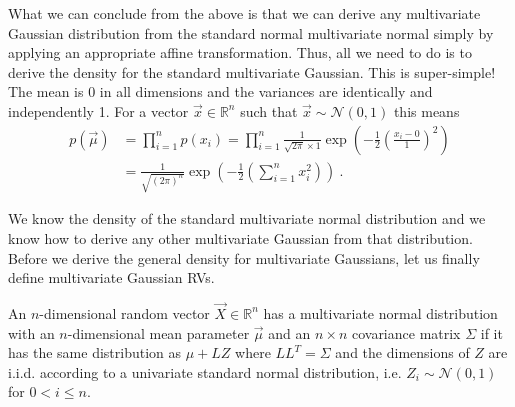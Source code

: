 \documentclass[a4paper,11pt,leqno]{report}\usepackage[]{graphicx}\usepackage[]{color}
\newcommand{\N}[2]{\mathcal{N}\left( #1, #2 \right)}
\begin{document}
What we can conclude from the above is that we can derive any multivariate Gaussian distribution from the standard normal multivariate normal simply by applying an
appropriate affine transformation. Thus, all we need to do is to derive the density for the standard multivariate Gaussian. This is super-simple! The mean is $ 0 $
in all dimensions and the variances are identically and independently 1. For a vector $ \vec{x} \in \mathbb{R}^{n} $ such that $ \vec{x} \sim \N{0}{1} $ this means
\begin{align}\label{eq:mvstandardNormal}
p(\vec{\mu}) &= \prod_{i=1}^{n} p(x_{i}) = \prod_{i=1}^{n} \frac{1}{\sqrt{2\pi} \times 1} \exp \left(-\frac{1}{2}\left( \frac{x_{i} - 0}{1} \right)^{2} \right) \\
&= \frac{1}{\sqrt{(2\pi)^{n}}} \exp \left(-\frac{1}{2}\left( \sum_{i=1}^{n}x_{i}^{2} \right) \right) \ . \nonumber
\end{align}

We know the density of the standard multivariate normal distribution and we know how to derive any other multivariate Gaussian from that distribution. Before
we derive the general density for multivariate Gaussians, let us finally define multivariate Gaussian RVs.
\begin{Definition}
An $ n $-dimensional random vector $ \vec{X} \in \mathbb{R}^{n} $ has a multivariate normal distribution with an $ n $-dimensional mean parameter 
$ \vec{\mu} $ and an $ n \times n $ covariance matrix $ \Sigma $ if it has the same distribution as $ \mu + LZ $ where $ LL^{T} = \Sigma $ and 
the dimensions of $ Z $ are i.i.d. according to a univariate standard normal distribution, i.e. $ Z_{i} \sim \N{0}{1} $ for $ 0 < i \leq n $.
\end{Definition}
\end{document}

